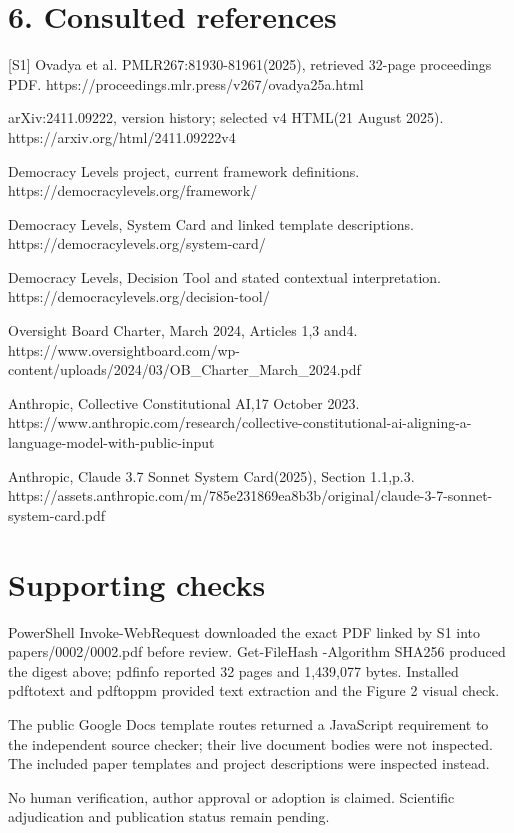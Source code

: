 \documentclass[10pt]{article}
\begin{document}
\section*{6. Consulted references}
[S1] Ovadya et al. PMLR267:81930-81961(2025), retrieved 32-page proceedings PDF. https://proceedings.mlr.press/v267/ovadya25a.html\par
arXiv:2411.09222, version history; selected v4 HTML(21 August 2025). https://arxiv.org/html/2411.09222v4\par
Democracy Levels project, current framework definitions. https://democracylevels.org/framework/\par
Democracy Levels, System Card and linked template descriptions. https://democracylevels.org/system-card/\par
Democracy Levels, Decision Tool and stated contextual interpretation. https://democracylevels.org/decision-tool/\par
Oversight Board Charter, March 2024, Articles 1,3 and4. https://www.oversightboard.com/wp-content/uploads/2024/03/OB\_Charter\_March\_2024.pdf\par
Anthropic, Collective Constitutional AI,17 October 2023. https://www.anthropic.com/research/collective-constitutional-ai-aligning-a-language-model-with-public-input\par
Anthropic, Claude 3.7 Sonnet System Card(2025), Section 1.1,p.3. https://assets.anthropic.com/m/785e231869ea8b3b/original/claude-3-7-sonnet-system-card.pdf\par
\section*{Supporting checks}
PowerShell Invoke-WebRequest downloaded the exact PDF linked by S1 into papers/0002/0002.pdf before review. Get-FileHash -Algorithm SHA256 produced the digest above; pdfinfo reported 32 pages and 1,439,077 bytes. Installed pdftotext and pdftoppm provided text extraction and the Figure 2 visual check.\par
The public Google Docs template routes returned a JavaScript requirement to the independent source checker; their live document bodies were not inspected. The included paper templates and project descriptions were inspected instead.\par
No human verification, author approval or adoption is claimed. Scientific adjudication and publication status remain pending.\par
\end{document}
